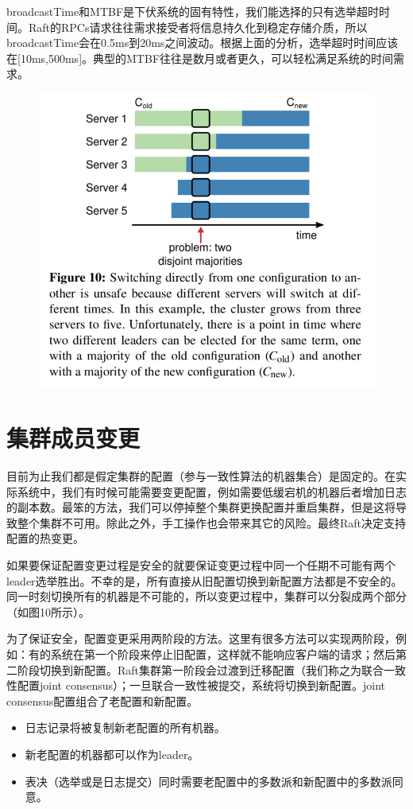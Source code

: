 \documentclass[journal]{IEEEtran}
\begin{document}
broadcastTime和MTBF是下伏系统的固有特性，我们能选择的只有选举超时时间。Raft的RPCs请求往往需求接受者将信息持久化到稳定存储介质，所以broadcastTime会在0.5ms到20ms之间波动。根据上面的分析，选举超时时间应该在[10ms,500ms]。典型的MTBF往往是数月或者更久，可以轻松满足系统的时间需求。

\begin{figure}[htbp]
\begin{center}
\includegraphics[width=1\linewidth]{./fig10.png}
\end{center}
\end{figure}

\section{集群成员变更}
目前为止我们都是假定集群的配置（参与一致性算法的机器集合）是固定的。在实际系统中，我们有时候可能需要变更配置，例如需要低缓宕机的机器后者增加日志的副本数。最笨的方法，我们可以停掉整个集群更换配置并重启集群，但是这将导致整个集群不可用。除此之外，手工操作也会带来其它的风险。最终Raft决定支持配置的热变更。

如果要保证配置变更过程是安全的就要保证变更过程中同一个任期不可能有两个leader选举胜出。不幸的是，所有直接从旧配置切换到新配置方法都是不安全的。同一时刻切换所有的机器是不可能的，所以变更过程中，集群可以分裂成两个部分（如图10所示）。

为了保证安全，配置变更采用两阶段的方法。这里有很多方法可以实现两阶段，例如：有的系统在第一个阶段来停止旧配置，这样就不能响应客户端的请求；然后第二阶段切换到新配置。Raft集群第一阶段会过渡到迁移配置（我们称之为联合一致性配置joint consensus）；一旦联合一致性被提交，系统将切换到新配置。joint consensus配置组合了老配置和新配置。
\begin{itemize}
\item 日志记录将被复制新老配置的所有机器。
\item 新老配置的机器都可以作为leader。
\item 表决（选举或是日志提交）同时需要老配置中的多数派和新配置中的多数派同意。
\end{itemize}
\end{document}
